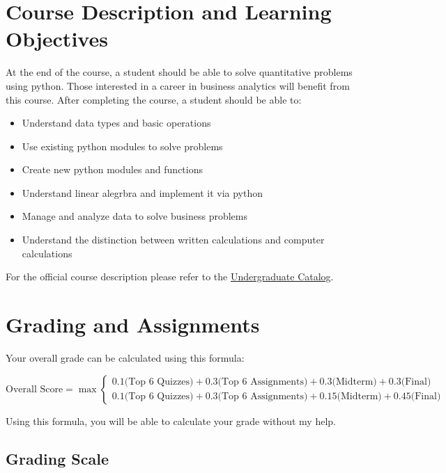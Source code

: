 \documentclass[11pt]{paper}
\begin{document}
\section{Course Description and Learning Objectives}

At the end of the course, a student should be able to solve quantitative problems using python. Those interested in a career in business analytics will benefit from this course. After completing the course, a student should be able to:

\begin{itemize}
\item Understand data types and basic operations
\item Use existing python modules to solve problems
\item Create new python modules and functions
\item Understand linear alegrbra and implement it via python
\item Manage and analyze data to solve business problems
\item Understand the distinction between written calculations and computer calculations 
\end{itemize}

For the official course description please refer to the \href{http://catalog.ucf.edu/search_advanced.php?catoid=14}{Undergraduate Catalog}.

\section{Grading and Assignments}

Your overall grade can be calculated using this formula:

  \begin{equation*}
    \text{Overall Score} = \max
    \begin{cases}
      0.1 \text{(Top 6 Quizzes)} + 0.3 \text{(Top 6 Assignments)} + 0.3 \text{(Midterm)} + 0.3 \text{(Final)} \\
      0.1 \text{(Top 6 Quizzes)} + 0.3 \text{(Top 6 Assignments)} + 0.15 \text{(Midterm)} + 0.45 \text{(Final)}
    \end{cases}
  \end{equation*}

Using this formula, you will be able to calculate your grade without my help.

\subsection{Grading Scale}
\end{document}
